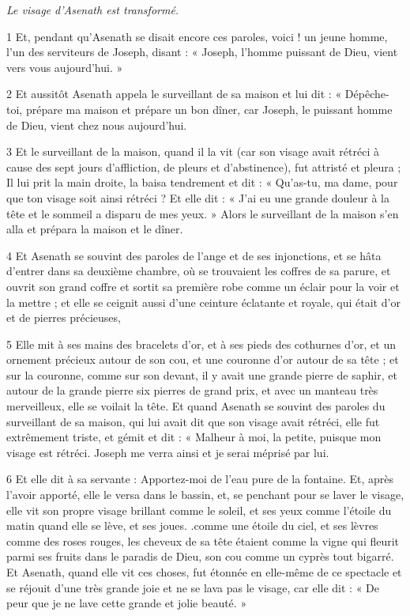 
\par \textit{Le visage d'Asenath est transformé.}

\par 1 Et, pendant qu'Asenath se disait encore ces paroles, voici ! un jeune homme, l'un des serviteurs de Joseph, disant : « Joseph, l'homme puissant de Dieu, vient vers vous aujourd'hui. »

\par 2 Et aussitôt Asenath appela le surveillant de sa maison et lui dit : « Dépêche-toi, prépare ma maison et prépare un bon dîner, car Joseph, le puissant homme de Dieu, vient chez nous aujourd'hui.

\par 3 Et le surveillant de la maison, quand il la vit (car son visage avait rétréci à cause des sept jours d'affliction, de pleurs et d'abstinence), fut attristé et pleura ; Il lui prit la main droite, la baisa tendrement et dit : « Qu'as-tu, ma dame, pour que ton visage soit ainsi rétréci ? Et elle dit : « J'ai eu une grande douleur à la tête et le sommeil a disparu de mes yeux. » Alors le surveillant de la maison s'en alla et prépara la maison et le dîner.

\par 4 Et Asenath se souvint des paroles de l'ange et de ses injonctions, et se hâta d'entrer dans sa deuxième chambre, où se trouvaient les coffres de sa parure, et ouvrit son grand coffre et sortit sa première robe comme un éclair pour la voir et la mettre ; et elle se ceignit aussi d'une ceinture éclatante et royale, qui était d'or et de pierres précieuses,

\par 5 Elle mit à ses mains des bracelets d'or, et à ses pieds des cothurnes d'or, et un ornement précieux autour de son cou, et une couronne d'or autour de sa tête ; et sur la couronne, comme sur son devant, il y avait une grande pierre de saphir, et autour de la grande pierre six pierres de grand prix, et avec un manteau très merveilleux, elle se voilait la tête. Et quand Asenath se souvint des paroles du surveillant de sa maison, qui lui avait dit que son visage avait rétréci, elle fut extrêmement triste, et gémit et dit : « Malheur à moi, la petite, puisque mon visage est rétréci. Joseph me verra ainsi et je serai méprisé par lui.

\par 6 Et elle dit à sa servante : Apportez-moi de l'eau pure de la fontaine. Et, après l'avoir apporté, elle le versa dans le bassin, et, se penchant pour se laver le visage, elle vit son propre visage brillant comme le soleil, et ses yeux comme l'étoile du matin quand elle se lève, et ses joues. .comme une étoile du ciel, et ses lèvres comme des roses rouges, les cheveux de sa tête étaient comme la vigne qui fleurit parmi ses fruits dans le paradis de Dieu, son cou comme un cyprès tout bigarré. Et Asenath, quand elle vit ces choses, fut étonnée en elle-même de ce spectacle et se réjouit d'une très grande joie et ne se lava pas le visage, car elle dit : « De peur que je ne lave cette grande et jolie beauté. »

